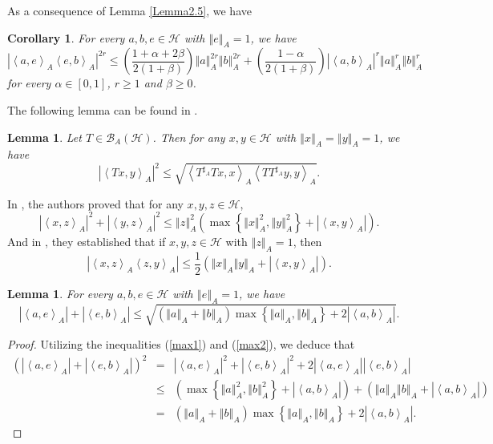 \documentclass{article}
\newcommand{\bra}[1]{\left(#1\right)}
\newcommand{\seqA}[1]{{\left<#1\right>}_{A}}
\newcommand{\normA}[1]{{\left\Vert#1\right\Vert}_{A}}
\newcommand{\abs}[1]{\left\vert#1\right\vert}
\newcommand{\set}[1]{\left\{#1\right\}}
\newcommand {\h}{\mathcal{H}}
\newcommand {\Ta}{T^{\sharp_{A}}}
\renewcommand {\b}{\mathcal{B}}
\newtheorem{lemma}[theorem]{Lemma}
\newtheorem{corollary}[theorem]{Corollary}
\begin{document}
As a consequence of  Lemma \ref{Lemma2.5}, we have
\begin{corollary}\label{Corollary2.7} For every $a,b,e\in\h$ with $\normA{e}=1$, we have
\begin{equation*}
  \abs{\seqA{a,e}\seqA{e,b}}^{2r}\leq \bra{\frac{1+\alpha+2\beta}{2(1+\beta)}}\normA{a}^{2r}\normA{b}^{2r}+\bra{\frac{1-\alpha}{2(1+\beta)}}\abs{\seqA{a,b}}^{r}\normA{a}^r\normA{b}^r
\end{equation*}
for every $\alpha\in [0,1]$, $r\geq 1$  and $\beta\geq 0$.
\end{corollary}

The following lemma can be found in \cite{QHB}.
\begin{lemma} Let $T\in\b_A(\h)$. Then for any $x,y\in\h$ with $\normA{x}=\normA{y}=1$, we have
$$\abs{\seqA{Tx,y}}^2\leq \sqrt{\seqA{\Ta T x,x}\seqA{T\Ta y,y}}.$$
\end{lemma}
In \cite{QHB}, the authors proved that for any $x,y,z\in\h$,
\begin{equation}\label{max1}
  \abs{\seqA{x,z}}^2+\abs{\seqA{y,z}}^2\leq \normA{z}^2\bra{\max\set{\normA{x}^2,\normA{y}^2}+\abs{\seqA{x,y}}}.
\end{equation}
And in \cite{XYZ}, they established that if $x,y,z\in\h$ with $\normA{z}=1$, then
\begin{equation}\label{max2}
  \abs{\seqA{x,z}\seqA{z,y}}\leq \frac{1}{2}\bra{\normA{x}\normA{y}+\abs{\seqA{x,y}}}.
\end{equation}
\begin{lemma}\label{Qadri1} For every $a,b,e\in\h$ with $\normA{e}=1$, we have
\begin{equation}\label{Result1}
  \abs{\seqA{a,e}}+\abs{\seqA{e,b}}\leq \sqrt{\bra{\normA{a}+\normA{b}}\max\set{\normA{a},\normA{b}}
  +2\abs{\seqA{a,b}}}.
\end{equation}
\end{lemma}
\begin{proof} Utilizing the inequalities (\ref{max1}) and (\ref{max2}), we deduce that
\begin{eqnarray*}
  \bra{\abs{\seqA{a,e}}+\abs{\seqA{e,b}}}^2 &=&\abs{\seqA{a,e}}^2+\abs{\seqA{e,b}}^2+2\abs{\seqA{a,e}}\abs{\seqA{e,b}} \\
   &\leq&\bra{\max\set{\normA{a}^2,\normA{b}^2}+\abs{\seqA{a,b}}}+  \bra{\normA{a}\normA{b}+\abs{\seqA{a,b}}}\\
   &=& \bra{\normA{a}+\normA{b}}\max\set{\normA{a},\normA{b}}
  +2\abs{\seqA{a,b}}.
\end{eqnarray*}
\end{proof}
\end{document}
